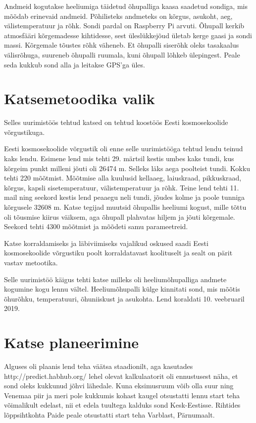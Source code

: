 \documentclass{trkut}%
\begin{document}
Andmeid kogutakse heeliumiga täidetud õhupalliga kaasa saadetud sondiga, mis mõõdab erinevaid andmeid. Põhilisteks andmeteks on kõrgus, asukoht, aeg, välistemperatuur ja rõhk. Sondi pardal on Raspberry Pi arvuti. Õhupall kerkib atmosfääri kõrgemadesse kihtidesse, sest üleslükkejõud ületab kerge gaasi ja sondi massi. Kõrgemale tõustes rõhk väheneb. Et õhupalli siserõhk oleks tasakaalus välisrõhuga, suureneb õhupalli ruumala, kuni õhupall lõhkeb ülepingest. Peale seda kukkub sond alla ja leitakse GPS'ga üles.

\section{Katsemetoodika valik}
Selles uurimistöös tehtud katsed on tehtud koostöös Eesti kosmosekoolide võrgustikuga.

Eesti kosmosekoolide võrgustik oli enne selle uurimistööga tehtud lendu teinud kaks lendu. Esimene lend mis tehti 29. märtsil kestis umbes kaks tundi, kus kõrgeim punkt milleni jõuti oli 26474 m. Selleks läks aega poolteist tundi. Kokku tehti 220 mõõtmist. Mõõtmise alla kuulusid kellaaeg, laiuskraad, pikkuskraad, kõrgus, kapsli sisetemperatuur, välistemperatuur ja rõhk. Teine lend tehti 11. mail ning seekord kestis lend peaaegu neli tundi, jõudes kolme ja poole tunniga kõrgusele 32608 m. Katse tegijad muutsid õhupallis heeliumi kogust, mille tõttu oli tõusmise kiirus väiksem, aga õhupall plahvatas hiljem ja jõuti kõrgemale. Seekord tehti 4300 mõõtmist ja mõõdeti samu parameetreid.

Katse korraldamiseks ja läbiviimiseks vajalikud oskused saadi Eesti kosmosekoolide võrgustiku poolt korraldatavast koolituselt ja sealt on pärit vastav metootika.

Selle uurimistöö käigus tehti katse milleks oli heeliumõhupalliga andmete kogumine kogu lennu vältel. Heeliumõhupalli külge kinnitati sond, mis mõõtis õhurõhku, temperatuuri, õhuniiskust ja asukohta. Lend koraldati 10. veebruaril 2019.

\section{Katse planeerimine}
Alguses oli plaanis lend teha väätsa staadionilt, aga kasutades http://predict.habhub.org/ lehel olevat kalkulaatorit oli ennustusest näha, et sond oleks kukkunud jõhvi lähedale. Kuna eksimusruum võib olla suur ning Venemaa piir ja meri pole kukkumis kohast kaugel otsustatti lennu start teha võimalikult edelast, nii et edela tuultega kalduks sond Kesk-Eestisse. Rihtides lõppsihtkohta Paide peale otsustatti start teha Varblast, Pärnumaalt.
\end{document}
